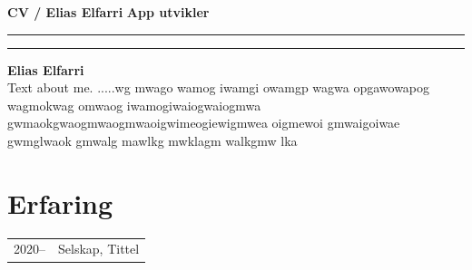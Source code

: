 \documentclass[a4paper,11pt]{article}
\begin{document}
\noindent \textbf{CV / Elias Elfarri} \hfill \textbf{App utvikler} \\
\rule{\linewidth}{0.5pt}



\begin{paracol}{2}
\begin{flushleft}

    \vspace{1em}
    \noindent\rule{4cm}{10pt}
    

    \vspace{1.5em}
    {\Huge \textbf{Elias Elfarri}} \\
    \vspace{0.5em}
    Text about me. .....wg mwago wamog iwamgi owamgp wagwa opgawowapog 
    wagmokwag omwaog iwamogiwaiogwaiogmwa
    gwmaokgwaogmwaogmwaoigwimeogiewigmwea 
    oigmewoi gmwaigoiwae gwmglwaok gmwalg mawlkg mwklagm walkgmw lka 
\end{flushleft}

\switchcolumn

\vspace{5em}
\begin{center}
    
\end{center}
\vspace{2em}

\section{Erfaring}
\begin{tabular}{@{}ll}
2020-- & Selskap, Tittel \\
\end{tabular}


\end{paracol}
\end{document}
